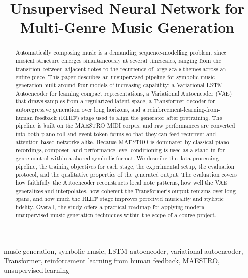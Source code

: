 \documentclass[conference]{IEEEtran}
\begin{document}
\title{Unsupervised Neural Network for Multi-Genre Music Generation}

\author{
}

\maketitle

\begin{abstract}
Automatically composing music is a demanding sequence-modelling problem, since musical structure emerges simultaneously at several timescales, ranging from the transition between adjacent notes to the recurrence of large-scale themes across an entire piece. This paper describes an unsupervised pipeline for symbolic music generation built around four models of increasing capability: a Variational LSTM Autoencoder for learning compact representations, a Variational Autoencoder (VAE) that draws samples from a regularized latent space, a Transformer decoder for autoregressive generation over long horizons, and a reinforcement-learning-from-human-feedback (RLHF) stage used to align the generator after pretraining. The pipeline is built on the MAESTRO MIDI corpus, and raw performances are converted into both piano-roll and event-token forms so that they can feed recurrent and attention-based networks alike. Because MAESTRO is dominated by classical piano recordings, composer- and performance-level conditioning is used as a stand-in for genre control within a shared symbolic format. We describe the data-processing pipeline, the training objectives for each stage, the experimental setup, the evaluation protocol, and the qualitative properties of the generated output. The evaluation covers how faithfully the Autoencoder reconstructs local note patterns, how well the VAE generalizes and interpolates, how coherent the Transformer's output remains over long spans, and how much the RLHF stage improves perceived musicality and stylistic fidelity. Overall, the study offers a practical roadmap for applying modern unsupervised music-generation techniques within the scope of a course project.
\end{abstract}

\begin{IEEEkeywords}
music generation, symbolic music, LSTM autoencoder, variational autoencoder, Transformer, reinforcement learning from human feedback, MAESTRO, unsupervised learning
\end{IEEEkeywords}
\end{document}
